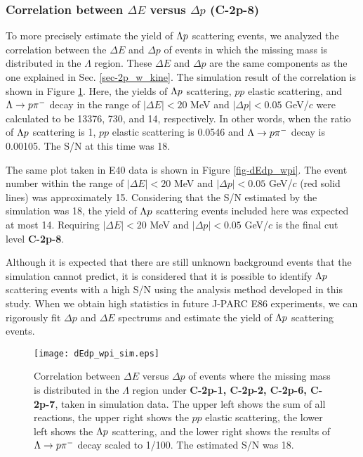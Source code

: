 \subsubsection{Correlation between $\Delta E$ versus $\Delta p$ ({\bf C-2p-8})}

To more precisely estimate the yield of $\Lambda p$ scattering events, we analyzed the correlation between the $\Delta E$ and $\Delta p$ of events in which the missing mass is distributed in the $\Lambda$ region.
These $\Delta E$ and $\Delta p$ are the same components as the one explained in Sec. \ref{sec-2p_w_kine}.
The simulation result of the correlation is shown in Figure \ref{fig-dEdp_wpi_sim}. Here, the yields of $\Lambda p$ scattering, $pp$ elastic scattering, and $\Lambda\to p\pi^{-}$ decay in the range of $|\Delta E|<20$ MeV and $|\Delta p|<0.05$ GeV/$c$ were calculated to be 13376, 730, and 14, respectively. In other words, when the ratio of $\Lambda p$ scattering is 1, $pp$ elastic scattering is 0.0546 and $\Lambda\to p\pi^{-}$ decay is 0.00105. The S/N at this time was 18.

The same plot taken in E40 data is shown in Figure \ref{fig-dEdp_wpi}. The event number within the range of $|\Delta E|<20$ MeV and $|\Delta p|<0.05$ GeV/$c$ (red solid lines) was approximately 15. Considering that the S/N estimated by the simulation was 18, the yield of $\Lambda p$ scattering events included here was expected at most 14. Requiring $|\Delta E|<20$ MeV and $|\Delta p|<0.05$ GeV/$c$ is the final cut level {\bf C-2p-8}.

Although it is expected that there are still unknown background events that the simulation cannot predict, it is considered that it is possible to identify $\Lambda p$ scattering events with a high S/N using the analysis method developed in this study. When we obtain high statistics in future J-PARC E86 experiments, we can rigorously fit $\Delta p$ and $\Delta E$ spectrums and estimate the yield of $\Lambda p$ scattering events. 

\begin{figure}[!h]
  \begin{center}
    \texttt{[image: dEdp\_wpi\_sim.eps]}
    \caption{Correlation between $\Delta E$ versus $\Delta p$ of events where the missing mass is distributed in the $\Lambda$ region under {\bf C-2p-1, C-2p-2, C-2p-6, C-2p-7}, taken in simulation data. The upper left shows the sum of all reactions, the upper right shows the $pp$ elastic scattering, the lower left shows the $\Lambda p$ scattering, and the lower right shows the results of $\Lambda\to p\pi^{-}$ decay scaled to 1/100. The estimated S/N was 18.}
    \label{fig-dEdp_wpi_sim}
  \end{center}
\end{figure}


